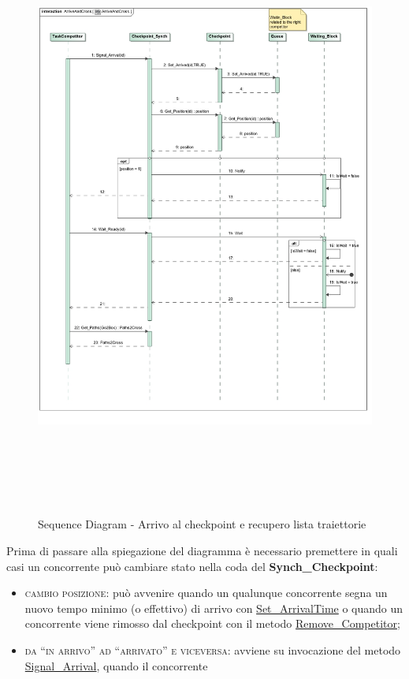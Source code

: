 \begin{description}
\begin{center}
\begin{figure}[h!]
	\includegraphics[scale=0.50,height=20cm]{img/SequenceDiagrams/ArriveAndCross.jpg}
\caption{Sequence Diagram - Arrivo al checkpoint e recupero lista traiettorie}
\end{figure}
\end{center}
\clearpage
Prima di passare alla spiegazione del diagramma \`{e} necessario premettere in quali casi un concorrente pu\`{o} cambiare stato nella coda del \textbf{Synch\_Checkpoint}:
\begin{itemize}
\item \textsc{cambio posizione}: pu\`{o} avvenire quando un qualunque concorrente segna un nuovo tempo minimo (o effettivo) 
di arrivo con \underline{Set\_ArrivalTime} o quando un concorrente viene rimosso dal checkpoint con il metodo \underline{Remove\_Competitor};
\item \textsc{da ``in arrivo'' ad ``arrivato'' e viceversa}: avviene su invocazione del metodo \underline{Signal\_Arrival}, quando il concorrente

\end{itemize}
\end{description}

